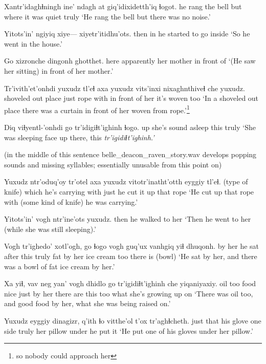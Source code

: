 \documentclass[12pt]{article}
\begin{document}
\gll Xantr'idaghɬningh ine' {ndagh at} giq'idixidetth'iq ɬogot.
{he rang the bell}  but  where    {it was quiet}      truly
\glt `He rang the bell but there was no noise.'
\glend

\gll Yitots'in' ngiyiq  xiye--- xiyetr'itidhu'ots.
then       in   {}  {he started to go inside}
\glt `So he went in the house.'
\glend

\gll Go   xizronche  dingonh    ghotthet.
here apparently {her mother} {in front of}
\glt `(He saw her sitting) in front of her mother.'
\glend

\gll Tr'ivith'et'onhdi  yuxudz tl'eɬ axa yuxudz vits'inxi   nixaghnthiveɬ che yuxudz.
{shoveled out place} just   rope  with {} {in front of her} {it's woven} too
\glt `In a shoveled out place there was a curtain in front of her woven from rope.'\footnote{so nobody could approach her}
\glend

\gll Diq viɬyentl-'onhdi   go   tr'idigiɬt'ighinh ɬogo.
up  {she's sound asleep} this {}                  truly
\glt `She was sleeping face up there, this \em tr'igidiɬt'ighinh\em .'
\glend

(in the middle of this sentence belle\_deacon\_raven\_story.wav develops popping sounds and
missing syllables; essentially unusable from this point on)

\gll Yuxudz ntr'oduq'oy   tr'otel        axa yuxudz  vitotr'inatht'otth eyggiy tl'eɬ.
{}     {(type of knife)} {which he's carrying} with just {he cut it up}  that   rope
\glt `He cut up that rope with (some kind of knife) he was carrying.'
\glend

\gll Yitots'in' {vogh ntr'ine'ots} yuxudz.
then       {he walked to her}
\glt `Then he went to her (while she was still sleeping).'
\glend

\gll Vogh   tr'ighedo' xotl'ogh, go   ɬogo vogh guq'ux vanhgiq yiɬ      dhuqonh.
{by her} {he sat}     after   this truly fat  {by her}   {ice cream} too {there is (bowl)}
\glt `He sat by her, and there was a bowl of fat ice cream by her.'
\glend

\gll Xa yiɬ, vav neg yan' vogh dhidlo go tr'igidiɬt'ighinh che yiqaniyaxiy.
oil too food nice just {by her} {there are} this {}           too {what she's growing up on}
\glt `There was oil too, and good food by her, what she was being raised on.'
\glend

\gll Yuxudz eyggiy dinagizr, q'ith    ɬo vitthe'ol  t'ox tr'aghɬcheth.
just     that   {his glove}    {one side} truly   {her pillow} under {he put it}
\glt `He put one of his gloves under her pillow.'
\glend
\end{document}
